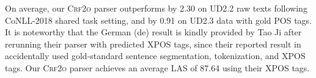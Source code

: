 On average, our \textsc{Crf2o} parser outperforms \citet{ji-etal-2019-graph} by 2.30 on UD2.2 raw texts following CoNLL-2018 shared task setting, and \citet{zhang-etal-2019-empirical} by 0.91 on UD2.3 data with gold POS tags.
It is noteworthy that the German (de) result is kindly provided by Tao Ji after rerunning their parser with predicted XPOS tags, since their reported result in \citet{ji-etal-2019-graph} accidentally used gold-standard sentence segmentation, tokenization, and XPOS tags.
Our \textsc{Crf2o} parser achieves an average LAS of 87.64 using their XPOS tags.




